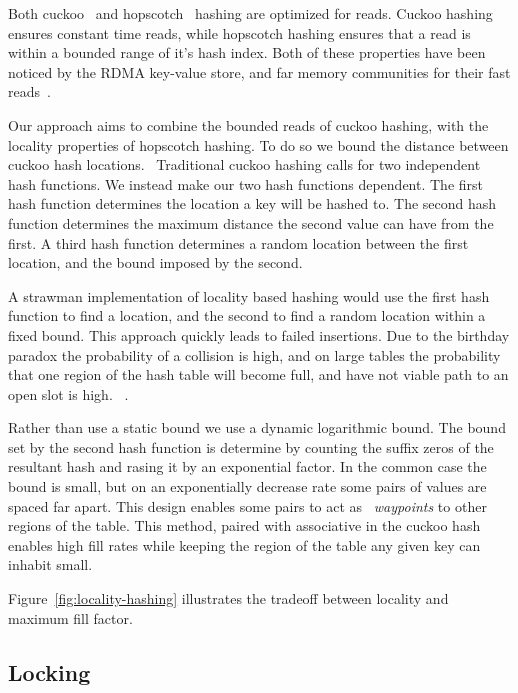 Both cuckoo~\cite{cuckoo} and hopscotch~\cite{hopscotch}
hashing are optimized for reads. Cuckoo hashing ensures
constant time reads, while hopscotch hashing ensures that a
read is within a bounded range of it's hash index. Both of
these properties have been noticed by the RDMA key-value
store, and far memory communities for their fast
reads~\cite{memc3,cuckoo-improvements,pilaf,farm}.

Our approach aims to combine the bounded reads of cuckoo
hashing, with the locality properties of hopscotch hashing.
To do so we bound the distance between cuckoo hash
locations.~ Traditional cuckoo hashing calls for
two independent hash functions. We instead make our two hash
functions dependent. The first hash function determines the
location a key will be hashed to. The second hash function
determines the maximum distance the second value can have
from the first. A third hash function determines a random
location between the first location, and the bound imposed
by the second.

A strawman implementation of locality based hashing would
use the first hash function to find a location, and the
second to find a random location within a fixed bound. This
approach quickly leads to failed insertions. Due to the
birthday paradox the probability of a collision is high, and
on large tables the probability that one region of the hash
table will become full, and have not viable path to an open
slot is high. ~.

Rather than use a static bound we use a dynamic logarithmic
bound. The bound set by the second hash function is
determine by counting the suffix zeros of the resultant hash
and rasing it by an exponential factor. In the common case
the bound is small, but on an exponentially decrease rate
some pairs of values are spaced far apart. This design
enables some pairs to act as ~\textit{waypoints} to other
regions of the table. This method, paired with associative
in the cuckoo hash enables high fill rates while keeping the
region of the table any given key can inhabit
small.

Figure~\ref{fig:locality-hashing} illustrates the tradeoff
between locality and maximum fill factor. 

\subsection{Locking}

